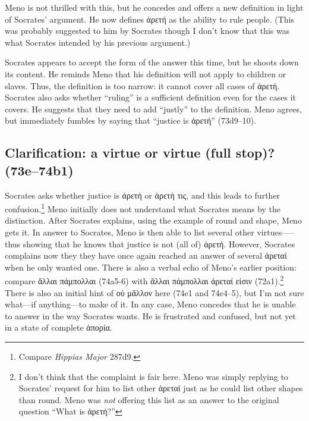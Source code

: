 \documentclass[12pt,letterpaper]{article}
\begin{document}
Meno is not thrilled with this, but he concedes and offers a new definition in light of Socrates' argument. He now defines \textgreek{ἀρετή} as the ability to rule people. (This was probably suggested to him by Socrates though I don't know that this was what Socrates intended by his previous argument.)

Socrates appears to accept the form of the answer this time, but he shoots down its content. He reminds Meno that his definition will not apply to children or slaves. Thus, the definition is too narrow: it cannot cover all cases of \textgreek{ἀρετή}. Socrates also asks whether ``ruling'' is a sufficient definition even for the cases it covers. He suggests that they need to add ``justly'' to the definition. Meno agrees, but immediately fumbles by saying that ``justice is \textgreek{ἀρετή}'' (73d9--10).

\subsection*{Clarification: a virtue or virtue (full stop)? (73e--74b1)}

Socrates asks whether justice is \textgreek{ἀρετή} or \textgreek{ἀρετή τις}, and this leads to further confusion.\footnote{Compare \textit{Hippias Major} 287d9.} Meno initially does not understand what Socrates means by the distinction. After Socrates explains, using the example of round and shape, Meno gets it. In answer to Socrates, Meno is then able to list several other virtues--—thus showing that he knows that justice is not (all of) \textgreek{ἀρετή}. However, Socrates complains now they they have once again reached an answer of several \textgreek{ἀρεταί} when he only wanted one. There is also a verbal echo of Meno's earlier position: compare \textgreek{ἄλλαι πάμπολλαι} (74a5-6) with \textgreek{ἄλλαι πάμπολλαι ἀρεταί εἰσιν} (72a1).\footnote{I don't think that the complaint is fair here. Meno was simply replying to Socrates' request for him to list other \textgreek{ἀρεταί} just as he could list other shapes than round. Meno was \textit{not} offering this list as an answer to the original question ``What is \textgreek{ἀρετή}?''} There is also an initial hint of \textgreek{οὐ μᾶλλον} here (74e1 and 74e4--5), but I'm not sure what—if anything—to make of it. In any case, Meno concedes that he is unable to answer in the way Socrates wants. He is frustrated and confused, but not yet in a state of complete \textgreek{ἀπορία}.
\end{document}
